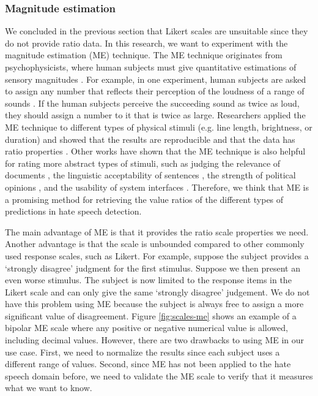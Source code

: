 \subsubsection{Magnitude estimation}
\label{sec:me}
We concluded in the previous section that Likert scales are unsuitable since they do not provide ratio data.
%
In this research, we want to experiment with the magnitude estimation (ME) technique.
%
The ME technique originates from psychophysicists, where human subjects must give quantitative estimations of sensory magnitudes \citep{stevens1956direct}.
%
For example, in one experiment, human subjects are asked to assign any number that reflects their perception of the loudness of a range of sounds \citep{stevens1956direct}.
%
If the human subjects perceive the succeeding sound as twice as loud, they should assign a number to it that is twice as large.
%
Researchers applied the ME technique to different types of physical stimuli (e.g. line length, brightness, or duration) and showed that the results are reproducible and that the data has ratio properties \citep{moskowitz1977magnitude}.
%
Other works have shown that the ME technique is also helpful for rating more abstract types of stimuli, such as judging the relevance of documents \citep{maddalena2017crowdsourcing, roitero2018fine}, the linguistic acceptability of sentences \citep{bard1996magnitude}, the strength of political opinions \citep{lodge1979comparisons, lodge1976calibration}, and the usability of system interfaces \citep{mcgee2004master}.
%
Therefore, we think that ME is a promising method for retrieving the value ratios of the different types of predictions in hate speech detection.
%

%
The main advantage of ME is that it provides the ratio scale properties we need.
%
Another advantage is that the scale is unbounded compared to other commonly used response scales, such as Likert.
%
For example, suppose the subject provides a `strongly disagree' judgment for the first stimulus.
%
Suppose we then present an even worse stimulus.
%
The subject is now limited to the response items in the Likert scale and can only give the same `strongly disagree' judgement.
%
We do not have this problem using ME because the subject is always free to assign a more significant value of disagreement.
%
Figure \ref{fig:scales-me} shows an example of a bipolar ME scale where any positive or negative numerical value is allowed, including decimal values.
%
However, there are two drawbacks to using ME in our use case.
%
First, we need to normalize the results since each subject uses a different range of values.
%
Second, since ME has not been applied to the hate speech domain before, we need to validate the ME scale to verify that it measures what we want to know.
%

